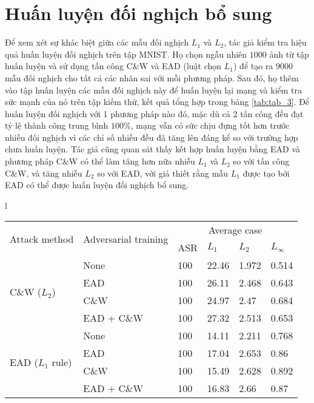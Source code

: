 \section{Huấn luyện đối nghịch bổ sung}
Để xem xét sự khác biệt giữa các mẫu đối nghịch $L_1$ và $L_2$, tác giả kiểm tra hiệu quả huấn luyện đối nghịch trên tập MNIST. Họ chọn ngẫu nhiên $1000$ ảnh từ tập huấn luyện và sử dụng tấn công C\&W và EAD (luật chọn $L_1$) để tạo ra $9000$ mẫu đối nghịch cho tất cả các nhãn sai với mỗi phương pháp. Sau đó, họ thêm vào tập huấn luyện các mẫu đối nghịch này để huấn luyện lại mạng và kiểm tra sức mạnh của nó trên tập kiếm thử, kết quả tổng hợp trong bảng \ref{tab:tab_3}. Để huấn luyện đối nghịch với 1 phương pháp nào đó, mặc dù cả 2 tấn công đều đạt tỷ lệ thành công trung bình $100\%$, mạng vẫn có sức chịu đựng tốt hơn trước nhiễu đối nghịch vì các chỉ số nhiễu đều đã tăng lên đáng kể so với trường hợp chưa huấn luyện. Tác giả cũng quan sát thấy kết hợp huấn luyện bằng EAD và phương pháp C\&W có thể làm tăng hơn nữa nhiễu $L_1$ và $L_2$ so với tấn công C\&W, và tăng nhiễu $L_2$ so với EAD, với giả thiết rằng mẫu $L_1$ được tạo bởi EAD có thể được huấn luyện đối nghịch bổ sung.  

\begin{longtable}{l}
		\begin{tabular}{ll|llll}
			\hline
			\multirow{2}{*}{Attack method} & \multirow{2}{*}{Adversarial training} & \multicolumn{4}{c}{Average case} \\
			& & ASR & $L_1$ & $L_2$ & $L_\infty$ \\
			\hline
			\multirow{4}{*}{C\&W ($L_2$)} & None & 100 & 22.46 & 1.972 & 0.514 \\
			& EAD & 100 & 26.11 & 2.468 & 0.643 \\
			& C\&W & 100 & 24.97 & 2.47 & 0.684 \\
			& EAD + C\&W & 100 & 27.32 & 2.513 & 0.653 \\
			\hline
			\multirow{4}{*}{EAD ($L_1$ rule)} & None & 100 & 14.11 & 2.211 & 0.768 \\
			& EAD & 100 & 17.04 & 2.653 & 0.86 \\
			& C\&W & 100 & 15.49 & 2.628 & 0.892 \\
			& EAD + C\&W & 100 & 16.83 & 2.66 & 0.87 \\
			\hline
		\end{tabular} \\
		\caption[Huấn luyện đối nghịch sử dụng tấn công C\&W và EAD (luật $L_1$) trên tập dữ liệu MNIST]{Huấn luyện đối nghịch sử dụng tấn công C\&W và EAD (luật $L_1$) trên tập dữ liệu MNIST. ASR là tỷ lệ tấn công thành công. Các kết hợp $L_1$ example triển khai huấn luyện đối nghịch và tăng cường độ khó của tấn công về phương diện nhiễu. Kết quả đầy đủ có trong tài liệu mở rộng.}
		\label{tab:tab_3}
\end{longtable}	
